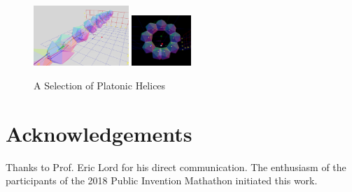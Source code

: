 \documentclass{svproc}
\begin{document}
\begin{figure}
{            \includegraphics[width=0.32\textwidth, height=0.15\textwidth]{figures/Planar.png}}
{     \includegraphics[width=0.2\textwidth]{figures/TheWheel.png}}
\caption{A Selection of Platonic Helices}\label{fig:platonichelices}
\end{figure}

\section{Acknowledgements}

Thanks to Prof. Eric Lord for his direct communication.
The enthusiasm of the participants of the 2018 Public Invention Mathathon
initiated this work.




\appendix
\end{document}

